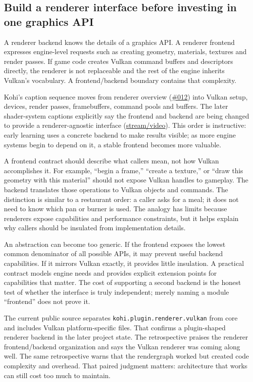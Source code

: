 \subsection{Build a renderer interface before investing in one graphics API}\label{06-engine-ii-ch025-build-a-renderer-interface-before-investing-in-one-graphics-api}

A renderer backend knows the details of a graphics API. A renderer frontend expresses engine-level requests such as creating geometry, materials, textures and render passes. If game code creates Vulkan command buffers and descriptors directly, the renderer is not replaceable and the rest of the engine inherits Vulkan's vocabulary. A frontend/backend boundary contains that complexity.

Kohi's caption sequence moves from renderer overview (\href{https://www.youtube.com/watch?v=70q9jtjWP4o}{\#012}) into Vulkan setup, devices, render passes, framebuffers, command pools and buffers. The later shader-system captions explicitly say the frontend and backend are being changed to provide a renderer-agnostic interface (\href{https://www.youtube.com/watch?v=4E0v_5Wva-8}{stream/video}). This order is instructive: early learning uses a concrete backend to make results visible; as more engine systems begin to depend on it, a stable frontend becomes more valuable.

A frontend contract should describe what callers mean, not how Vulkan accomplishes it. For example, ``begin a frame,'' ``create a texture,'' or ``draw this geometry with this material'' should not expose Vulkan handles to gameplay. The backend translates those operations to Vulkan objects and commands. The distinction is similar to a restaurant order: a caller asks for a meal; it does not need to know which pan or burner is used. The analogy has limits because renderers expose capabilities and performance constraints, but it helps explain why callers should be insulated from implementation details.

An abstraction can become too generic. If the frontend exposes the lowest common denominator of all possible APIs, it may prevent useful backend capabilities. If it mirrors Vulkan exactly, it provides little insulation. A practical contract models engine needs and provides explicit extension points for capabilities that matter. The cost of supporting a second backend is the honest test of whether the interface is truly independent; merely naming a module ``frontend'' does not prove it.

The current public source separates \texttt{kohi.plugin.renderer.vulkan} from core and includes Vulkan platform-specific files. That confirms a plugin-shaped renderer backend in the later project state. The retrospective praises the renderer frontend/backend organization and says the Vulkan renderer was coming along well. The same retrospective warns that the rendergraph worked but created code complexity and overhead. That paired judgment matters: architecture that works can still cost too much to maintain.

